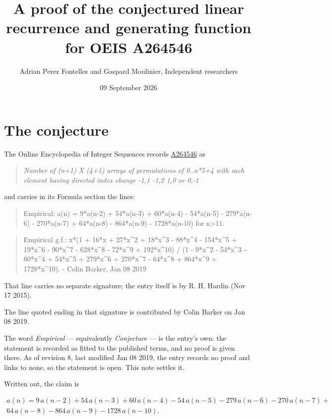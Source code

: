 \documentclass[11pt]{article}
\title{A proof of the conjectured linear recurrence and generating function for OEIS A264546}
\author{Adrian Perez Fontelles and Gaspard Moulinier, Independent researchers}
\date{09 September 2026}
\theoremstyle{definition}
\begin{document}
\maketitle
\section{The conjecture}

The Online Encyclopedia of Integer Sequences records \href{https://oeis.org/A264546}{A264546} as

\begin{quote}\itshape Number of (n+1) X (4+1) arrays of permutations of 0..n*5+4 with each element having directed index change -1,1 -1,2 1,0 or 0,-1\end{quote}

and carries in its Formula section the lines:

\begin{quote}\ttfamily Empirical: a(n) = 9*a(n-2) + 54*a(n-3) + 60*a(n-4) - 54*a(n-5) - 279*a(n-6) - 270*a(n-7) + 64*a(n-8) - 864*a(n-9) - 1728*a(n-10) for n>11.\end{quote}

\begin{quote}\ttfamily Empirical g.f.: x*(1 + 16*x + 27*x\textasciicircum{}2 + 18*x\textasciicircum{}3 - 88*x\textasciicircum{}4 - 154*x\textasciicircum{}5 + 19*x\textasciicircum{}6 - 90*x\textasciicircum{}7 - 628*x\textasciicircum{}8 - 72*x\textasciicircum{}9 + 192*x\textasciicircum{}10) / (1 - 9*x\textasciicircum{}2 - 54*x\textasciicircum{}3 - 60*x\textasciicircum{}4 + 54*x\textasciicircum{}5 + 279*x\textasciicircum{}6 + 270*x\textasciicircum{}7 - 64*x\textasciicircum{}8 + 864*x\textasciicircum{}9 + 1728*x\textasciicircum{}10). - Colin Barker, Jan 08 2019\end{quote}

That line carries no separate signature; the entry itself is by R. H. Hardin (Nov 17 2015).

The line quoted ending in that signature is contributed by Colin Barker on Jan 08 2019.

The word {\itshape Empirical} --- equivalently {\itshape Conjecture} --- is the entry's own: the statement is recorded as fitted to the published terms, and no proof is given there. As of revision 8, last modified Jan 08 2019, the entry records no proof and links to none, so the statement is open. This note settles it.

Written out, the claim is

\begin{multline*} a(n) = 9\,a(n-2) + 54\,a(n-3) + 60\,a(n-4) - 54\,a(n-5) - 279\,a(n-6) - 270\,a(n-7) + \\ 64\,a(n-8) - 864\,a(n-9) - 1728\,a(n-10). \end{multline*}
\end{document}
